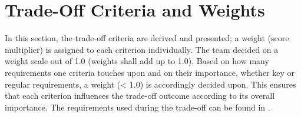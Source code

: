 \section{Trade-Off Criteria and Weights}
\label{sec:toffcriteriaandweights}
In this section, the trade-off criteria are derived and presented; a weight (score multiplier) is assigned to each criterion individually.
The team decided on a weight scale out of 1.0 (weights shall add up to 1.0).
Based on how many requirements one criteria touches upon and on their importance, whether key or regular requirements, a weight (< 1.0) is accordingly decided upon. This ensures that each criterion influences the trade-off outcome according to its overall importance. The requirements used during the trade-off can be found in .

\begin{table}[ht]
\caption{Requirements used for trade-off}
 \label{tab:reqtradeoff}
\end{table}
